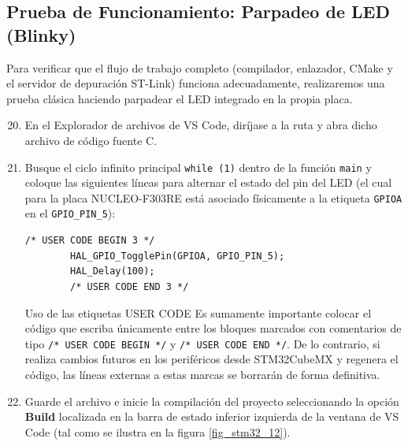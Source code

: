 \documentclass[
10pt, %
a4paper, %
oneside, %
headinclude,footinclude, %
BCOR5mm, %
]{scrartcl}
\begin{document}
\subsection{Prueba de Funcionamiento: Parpadeo de LED (Blinky)}

Para verificar que el flujo de trabajo completo (compilador, enlazador, CMake y el servidor de depuración ST-Link) funciona adecuadamente, realizaremos una prueba clásica haciendo parpadear el LED integrado en la propia placa.

\begin{enumerate}
	\setcounter{enumi}{19} %
	\item En el Explorador de archivos de VS Code, diríjase a la ruta  y abra dicho archivo de código fuente C.
	
	\item Busque el ciclo infinito principal \texttt{while (1)} dentro de la función \texttt{main} y coloque las siguientes líneas para alternar el estado del pin del LED (el cual para la placa NUCLEO-F303RE está asociado físicamente a la etiqueta \texttt{GPIOA} en el \texttt{GPIO\_PIN\_5}):
	
	\begin{lstlisting}[style=CMakeStyle]
		/* USER CODE BEGIN 3 */
		HAL_GPIO_TogglePin(GPIOA, GPIO_PIN_5);
		HAL_Delay(100);
		/* USER CODE END 3 */
	\end{lstlisting}
	
	\begin{InfoBox}{Uso de las etiquetas USER CODE}
		Es sumamente importante colocar el código que escriba únicamente entre los bloques marcados con comentarios de tipo \texttt{/* USER CODE BEGIN */} y \texttt{/* USER CODE END */}. De lo contrario, si realiza cambios futuros en los periféricos desde STM32CubeMX y regenera el código, las líneas externas a estas marcas se borrarán de forma definitiva.
	\end{InfoBox}
	
	\item Guarde el archivo e inicie la compilación del proyecto seleccionando la opción \textbf{Build} localizada en la barra de estado inferior izquierda de la ventana de VS Code (tal como se ilustra en la figura \ref{fig_stm32_12}).
	

\end{enumerate}
\end{document}
